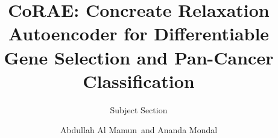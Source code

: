 \documentclass{bioinfo}
\begin{document}

\subtitle{Subject Section}

\title[short Title]{
CoRAE: Concreate Relaxation Autoencoder for Differentiable Gene Selection and Pan-Cancer Classification
}
\author[Sample \textit{et~al}.]{Abdullah Al Mamun\, and Ananda Mondal}

\address
{
School of Computing and Information Sciences, Miami, US \\
}



\end{document}
